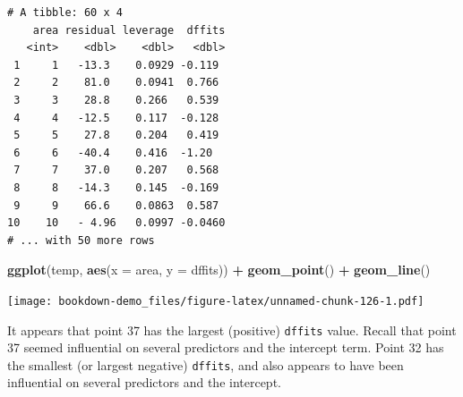 \documentclass[]{book}
\newenvironment{Shaded}{\begin{snugshade}}{\end{snugshade}}
\newcommand{\KeywordTok}[1]{\textcolor[rgb]{0.13,0.29,0.53}{\textbf{#1}}}
\newcommand{\DataTypeTok}[1]{\textcolor[rgb]{0.13,0.29,0.53}{#1}}
\newcommand{\DecValTok}[1]{\textcolor[rgb]{0.00,0.00,0.81}{#1}}
\newcommand{\StringTok}[1]{\textcolor[rgb]{0.31,0.60,0.02}{#1}}
\newcommand{\OperatorTok}[1]{\textcolor[rgb]{0.81,0.36,0.00}{\textbf{#1}}}
\newcommand{\NormalTok}[1]{#1}
\theoremstyle{definition}
\theoremstyle{definition}
\theoremstyle{definition}
\theoremstyle{remark}
\begin{document}
\begin{Shaded}
\end{Shaded}

\begin{verbatim}
# A tibble: 60 x 4
    area residual leverage  dffits
   <int>    <dbl>    <dbl>   <dbl>
 1     1   -13.3    0.0929 -0.119 
 2     2    81.0    0.0941  0.766 
 3     3    28.8    0.266   0.539 
 4     4   -12.5    0.117  -0.128 
 5     5    27.8    0.204   0.419 
 6     6   -40.4    0.416  -1.20  
 7     7    37.0    0.207   0.568 
 8     8   -14.3    0.145  -0.169 
 9     9    66.6    0.0863  0.587 
10    10   - 4.96   0.0997 -0.0460
# ... with 50 more rows
\end{verbatim}

\begin{Shaded}
\begin{Highlighting}[]
\KeywordTok{ggplot}\NormalTok{(temp, }\KeywordTok{aes}\NormalTok{(}\DataTypeTok{x =}\NormalTok{ area, }\DataTypeTok{y =}\NormalTok{ dffits)) }\OperatorTok{+}
\StringTok{    }\KeywordTok{geom_point}\NormalTok{() }\OperatorTok{+}
\StringTok{    }\KeywordTok{geom_line}\NormalTok{()}
\end{Highlighting}
\end{Shaded}

\texttt{[image: bookdown-demo\_files/figure-latex/unnamed-chunk-126-1.pdf]}

It appears that point 37 has the largest (positive) \texttt{dffits}
value. Recall that point 37 seemed influential on several predictors and
the intercept term. Point 32 has the smallest (or largest negative)
\texttt{dffits}, and also appears to have been influential on several
predictors and the intercept.

\begin{Shaded}
\end{Shaded}
\end{document}
